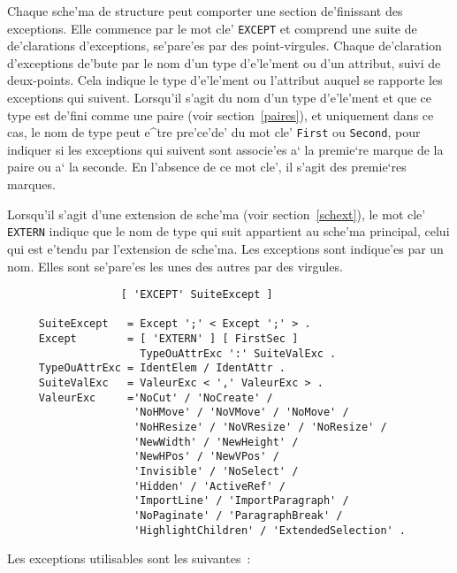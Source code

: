 {Chaque sche'ma de structure peut comporter une section de'finissant des
exceptions.
Elle commence par le mot cle' {\tt EXCEPT} et comprend une suite de
de'clarations d'exceptions, se'pare'es par des point-virgules. Chaque
de'claration d'exceptions de'bute par le nom d'un type d'e'le'ment ou
d'un attribut, suivi de deux-points. Cela indique le type d'e'le'ment
ou l'attribut auquel se rapporte les exceptions qui suivent.
Lorsqu'il s'agit du nom d'un type d'e'le'ment et que ce type est de'fini
comme une paire (voir section~\ref{paires}), et uniquement dans ce cas,
le nom de type peut e^tre pre'ce'de' du mot cle' {\tt First} ou {\tt Second},
pour indiquer si les exceptions qui suivent sont associe'es a` la premie`re
marque de la paire ou a` la seconde. En l'absence de ce mot cle', il s'agit
des premie`res marques.

Lorsqu'il s'agit d'une extension de sche'ma (voir section~\ref{schext}),
le mot cle' {\tt EXTERN} indique que le nom de type qui suit appartient au
sche'ma principal, celui qui est e'tendu par l'extension de sche'ma.
Les exceptions sont indique'es par un nom. Elles sont
se'pare'es les unes des autres par des virgules.

\begin{verbatim}
                  [ 'EXCEPT' SuiteExcept ]

     SuiteExcept   = Except ';' < Except ';' > .
     Except        = [ 'EXTERN' ] [ FirstSec ]
                     TypeOuAttrExc ':' SuiteValExc .
     TypeOuAttrExc = IdentElem / IdentAttr .
     SuiteValExc   = ValeurExc < ',' ValeurExc > .
     ValeurExc     ='NoCut' / 'NoCreate' /
                    'NoHMove' / 'NoVMove' / 'NoMove' /
                    'NoHResize' / 'NoVResize' / 'NoResize' /
                    'NewWidth' / 'NewHeight' /
                    'NewHPos' / 'NewVPos' /
                    'Invisible' / 'NoSelect' /
                    'Hidden' / 'ActiveRef' /
                    'ImportLine' / 'ImportParagraph' /
                    'NoPaginate' / 'ParagraphBreak' /
                    'HighlightChildren' / 'ExtendedSelection' .
\end{verbatim}

Les exceptions utilisables sont les suivantes~:

}
